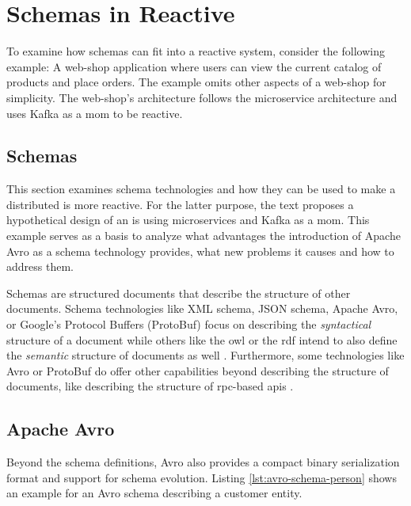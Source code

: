 
\section{Schemas in Reactive }\label{sec:schemas-in-reactive-is}

To examine how schemas can fit into a reactive system, consider the following example:
A web-shop application where users can view the current catalog of products and place orders.
The example omits other aspects of a web-shop for simplicity.
The web-shop's architecture follows the microservice architecture and uses Kafka as a \gls{mom} to be reactive.

\subsection{Schemas}

This section examines schema technologies and how they can be used to make a distributed \gls{is} more reactive.
For the latter purpose, the text proposes a hypothetical design of an \gls{is} using microservices and Kafka as a \gls{mom}.
This example serves as a basis to analyze what advantages the introduction of Apache Avro as a schema technology provides, what new problems it causes and how to address them.

Schemas are structured documents that describe the structure of other documents.
Schema technologies like XML schema, JSON schema, Apache Avro, or Google's Protocol Buffers (ProtoBuf) focus on describing the \emph{syntactical} structure of a document while others like the \gls{owl} or the \gls{rdf} intend to also define the \emph{semantic} structure of documents as well \parencites{xmlschema}{jsonschema}{avro}{protobuf}{owl}{rdf}.
Furthermore, some technologies like Avro or ProtoBuf do offer other capabilities beyond describing the structure of documents, like describing the structure of \gls{rpc}-based \glspl{api} \parencites{avro}{protobuf}.

\subsection{Apache Avro}

Beyond the schema definitions, Avro also provides a compact binary serialization format and support for schema evolution.
Listing \ref{lst:avro-schema-person} shows an example for an Avro schema describing a customer entity.
\parencite{avro}

